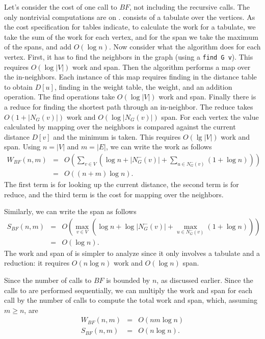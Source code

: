 Let's consider the cost of one call to $BF$, not including the
recursive calls.  The only nontrivial computations are on
.  consists of a
tabulate over the vertices. 
%
As the cost specification for tables indicate, to calculate the work
for a tabulate, we take the sum of the work for each vertex, and for
the span we take the maximum of the spans, and add $O(\log n)$.  
%
Now consider what the algorithm does for each vertex.  First, it has
to find the neighbors in the graph (using a \texttt{find G v}).  This
requires $O(\log |V|)$ work and span. 
%
Then the algorithm performs a map over the  in-neighbors. 
%
Each instance of this map requires finding in the distance table to
obtain $D[u]$, finding in the weight table, the weight, and an
addition operation.  
%
The find operations take $O(\log |V|)$ work and span.  
%
Finally there is a reduce for finding the shortest path through an
in-neighbor.  The reduce takes $O(1 + |N_G(v)|)$ work and $O(\log
|N_G(v)|)$ span.  
%
For each vertex the value calculated by mapping over the neighbors is
compared against the current distance $D[v]$ and the minimum is
taken.  This requires $O(\lg |V|)$ work and span.
%
Using $n = |V|$ and $m = |E|$, we can write the work
as follows
\begin{eqnarray*}
W_{BF}(n,m)
& = & O\left(\sum_{v \in V} \left(\log n + |N_G^-(v)| + \sum_{u
  \in N_G^-(v)} (1 + \log n)\right)\right) 
\\
& = & O\left((n + m) \log n\right). 
\end{eqnarray*}
%
The first term is for looking up the current distance, the second term
is for reduce, and the third term is the cost for mapping over the
neighbors.


Similarly,  we can write the span as follows
\begin{eqnarray*}
S_{BF}(n,m)
& = & O\left(\max_{v \in V} \left(\log n + \log |N_G^-(v)| + \max_{u
  \in N_G^-(v)} (1 + \log n)\right)\right) 
\\
& = & O(\log n). 
\end{eqnarray*}
%
The work and span of  is simpler to analyze since it only
involves a tabulate and a reduction: it requires $O(n \log n)$ work
and $O(\log n)$ span.

Since the number of calls to $BF$ is bounded by $n$, as discussed
earlier.  Since the calls to  are performed sequentially, we
can multiply the work and span for each call by the number of calls to
compute the total work and span, which, assuming $m \ge n$, are
\begin{eqnarray*}
W_{BF}(n,m) & = & O(n m \log n)\\
S_{BF}(n,m) & = & O(n \log n).\\
\end{eqnarray*}

